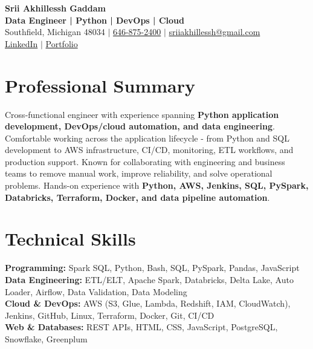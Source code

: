 \documentclass[letterpaper,10pt]{article}
\begin{document}
\fontsize{9.35pt}{10.45pt}\selectfont

\begin{center}
    {\LARGE \textbf{Srii Akhillessh Gaddam}} \\[-1pt]
    \textbf{Data Engineer | Python | DevOps | Cloud} \\[2pt]
    Southfield, Michigan 48034 $|$
    \href{tel:6468752400}{646-875-2400} $|$
    \href{mailto:sriiakhillessh@gmail.com}{sriiakhillessh@gmail.com} \\[1pt]
    \href{https://www.linkedin.com/in/srii-akhiilessh-gaddam-b48668191/}{LinkedIn} $|$
    \href{https://sriiakhillesshg.github.io/portfolio/}{Portfolio}
\end{center}
\vspace{-8pt}

\section{Professional Summary}
\small{Cross-functional engineer with experience spanning \textbf{Python application development, DevOps/cloud automation, and data engineering}. Comfortable working across the application lifecycle - from Python and SQL development to AWS infrastructure, CI/CD, monitoring, ETL workflows, and production support. Known for collaborating with engineering and business teams to remove manual work, improve reliability, and solve operational problems. Hands-on experience with \textbf{Python, AWS, Jenkins, SQL, PySpark, Databricks, Terraform, Docker, and data pipeline automation}.}

\section{Technical Skills}
\small{
\textbf{Programming:} Spark SQL, Python, Bash, SQL, PySpark, Pandas, JavaScript \\
\textbf{Data Engineering:} ETL/ELT, Apache Spark, Databricks, Delta Lake, Auto Loader, Airflow, Data Validation, Data Modeling \\
\textbf{Cloud \& DevOps:} AWS (S3, Glue, Lambda, Redshift, IAM, CloudWatch), Jenkins, GitHub, Linux, Terraform, Docker, Git, CI/CD \\
\textbf{Web \& Databases:} REST APIs, HTML, CSS, JavaScript, PostgreSQL, Snowflake, Greenplum
}

\end{document}

